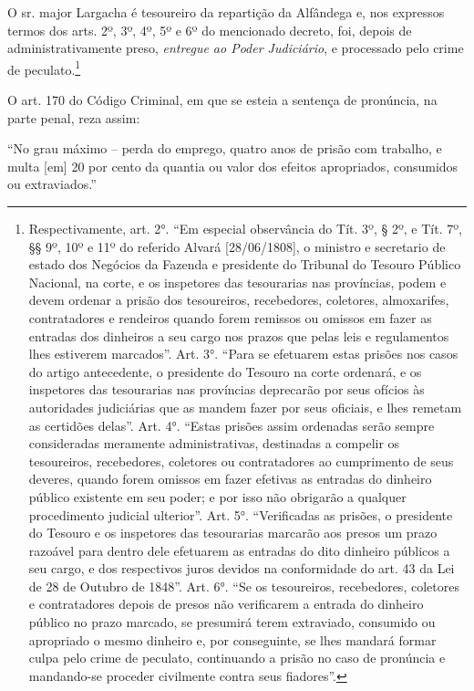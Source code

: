 O sr. major Largacha é tesoureiro da repartição da Alfândega e, nos
expressos termos dos arts. 2º, 3º, 4º, 5º e 6º do mencionado decreto,
foi, depois de administrativamente preso, \emph{entregue ao Poder
Judiciário}, e processado pelo crime de peculato.\footnote{Respectivamente,
  art. 2°. ``Em especial observância do Tít. 3º, § 2º, e Tít. 7º, §§ 9º,
  10º e 11º do referido Alvará {[}28/06/1808{]}, o ministro e secretario
  de estado dos Negócios da Fazenda e presidente do Tribunal do Tesouro
  Público Nacional, na corte, e os inspetores das tesourarias nas
  províncias, podem e devem ordenar a prisão dos tesoureiros,
  recebedores, coletores, almoxarifes, contratadores e rendeiros quando
  forem remissos ou omissos em fazer as entradas dos dinheiros a seu
  cargo nos prazos que pelas leis e regulamentos lhes estiverem
  marcados''. Art. 3°. ``Para se efetuarem estas prisões nos casos do
  artigo antecedente, o presidente do Tesouro na corte ordenará, e os
  inspetores das tesourarias nas províncias deprecarão por seus ofícios
  às autoridades judiciárias que as mandem fazer por seus oficiais, e
  lhes remetam as certidões delas''. Art. 4°. ``Estas prisões assim
  ordenadas serão sempre consideradas meramente administrativas,
  destinadas a compelir os tesoureiros, recebedores, coletores ou
  contratadores ao cumprimento de seus deveres, quando forem omissos em
  fazer efetivas as entradas do dinheiro público existente em seu poder;
  e por isso não obrigarão a qualquer procedimento judicial ulterior''.
  Art. 5°. ``Verificadas as prisões, o presidente do Tesouro e os
  inspetores das tesourarias marcarão aos presos um prazo razoável para
  dentro dele efetuarem as entradas do dito dinheiro públicos a seu
  cargo, e dos respectivos juros devidos na conformidade do art. 43 da
  Lei de 28 de Outubro de 1848''. Art. 6°. ``Se os tesoureiros,
  recebedores, coletores e contratadores depois de presos não
  verificarem a entrada do dinheiro público no prazo marcado, se
  presumirá terem extraviado, consumido ou apropriado o mesmo dinheiro
  e, por conseguinte, se lhes mandará formar culpa pelo crime de
  peculato, continuando a prisão no caso de pronúncia e mandando-se
  proceder civilmente contra seus fiadores''.}

O art. 170 do Código Criminal, em que se esteia a sentença de pronúncia,
na parte penal, reza assim:

``No grau máximo -- perda do emprego, quatro anos de prisão com
trabalho, e multa {[}em{]} 20 por cento da quantia ou valor dos efeitos
apropriados, consumidos ou extraviados.''

